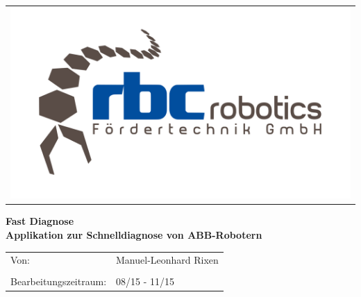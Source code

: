 \begin{titlepage}
\hspace{9cm}
\begin{minipage}{1in}
\begin{tabular}{l}
\includegraphics[width=2\textwidth]{03_Grafiken/logo.png}
\end{tabular}
\end{minipage}
\begin{center}
\vfill
{ \huge \textbf{Fast Diagnose} }\\[0.4cm]
{ \LARGE \textbf{Applikation zur Schnelldiagnose von ABB-Robotern} }\\[0.4cm]
\end{center}
\begin{center}
\vfill
\begin{tabular}{p{5cm}l}
Von: & Manuel-Leonhard Rixen\\
&\\
Bearbeitungszeitraum: & 08/15 - 11/15
\end{tabular} 

\end{center}
\vfill
\begin{center}
%
%
\vfill
\end{center}
\end{titlepage}